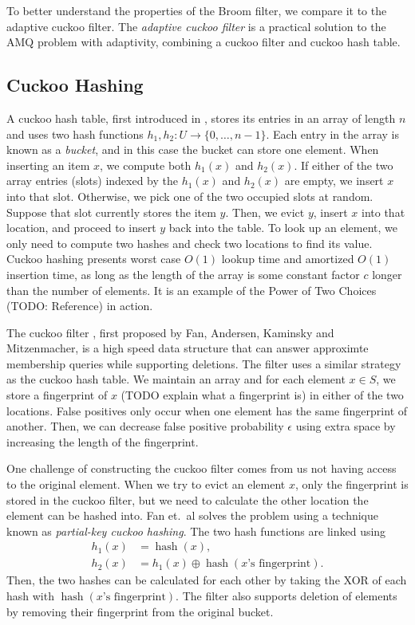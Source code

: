 \documentclass[../paper.tex]{subfiles}
\begin{document}
\newcommand{\on}{\operatorname}
To better understand the properties of the Broom filter, we compare it to the adaptive cuckoo filter.
The \emph{adaptive cuckoo filter} \cite{adaptive-cuckoo} is a practical solution to the AMQ problem with adaptivity, combining a cuckoo filter and cuckoo hash table.

\subsection{Cuckoo Hashing}
A cuckoo hash table, first introduced in \cite{cuckoo-hash}, stores its entries in an array of length $n$ and uses two hash functions $h_1,h_2:U\to \{0,\ldots,n-1\}$.
Each entry in the array is known as a \emph{bucket}, and in this case the bucket can store one element. When inserting an item $x$, we compute both $h_1(x)$ and $h_2(x)$. If either of the two array entries (slots) indexed by the $h_1(x)$ and $h_2(x)$ are empty, we insert $x$ into that slot.
Otherwise, we pick one of the two occupied slots at random. Suppose that slot currently stores the item $y$. Then, we evict $y$, insert $x$ into that location,
and proceed to insert $y$ back into the table. To look up an element, we only need to compute two hashes and check two locations to find its value.
Cuckoo hashing presents worst case $O(1)$ lookup time and amortized $O(1)$ insertion time, as long as the length of the array is some constant factor $c$ longer
than the number of elements. It is an example of the Power of Two Choices (TODO: Reference) in action.

The cuckoo filter \cite{cuckoo-filter}, first proposed by Fan, Andersen, Kaminsky and Mitzenmacher, is a high speed data structure that can answer approximte membership queries while supporting deletions.
The filter uses a similar strategy as the cuckoo hash table. We maintain an array and for each element $x\in S$, we store a fingerprint of $x$ (TODO explain what a fingerprint is) in either of the two locations. False positives only occur when one element has the same fingerprint of another. Then, we can decrease false positive probability $\epsilon$ using extra space by increasing the length of the fingerprint.

One challenge of constructing the cuckoo filter comes from us not having access to the original element. When we try to evict an element $x$, only the fingerprint
is stored in the cuckoo filter, but we need to calculate the other location the element can be hashed into. Fan et.\ al solves the problem using a technique known as \emph{partial-key cuckoo hashing}.
The two hash functions are linked using \begin{align*}
    h_1(x)&=\on{hash}(x), \\ h_2(x)&=h_1(x)\oplus \on{hash}(x\text{'s fingerprint}).
\end{align*} Then, the two hashes can be calculated for each other by taking the XOR of each hash with $\on{hash}(x\text{'s fingerprint})$. The filter also supports deletion of elements by removing their fingerprint from the original bucket.
\end{document}
